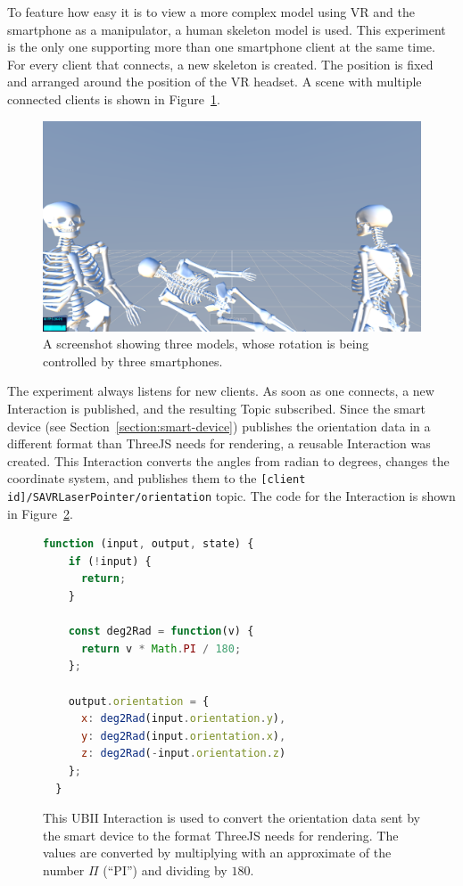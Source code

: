 To feature how easy it is to view a more complex model using VR and the smartphone as a manipulator, a human skeleton model is used. This experiment is the only one supporting more than one smartphone client at the same time. For every client that connects, a new skeleton is created. The position is fixed and arranged around the position of the \ac{VR} headset. A scene with multiple connected clients is shown in Figure~\ref{fig:screenshot-exp-mv}.

\begin{figure}[H]
	\centering
	\includegraphics[width=12cm]{figures/implementation/screenshot_exp_mv.png}
	\caption[Screenshot of the model viewer]{A screenshot showing three models, whose rotation is being controlled by three smartphones.}\label{fig:screenshot-exp-mv}
\end{figure}

The experiment always listens for new clients. As soon as one connects, a new Interaction is published, and the resulting Topic subscribed. Since the smart device (see Section~\ref{section:smart-device}) publishes the orientation data in a different format than ThreeJS needs for rendering, a reusable Interaction was created. This Interaction converts the angles from radian to degrees, changes the coordinate system, and publishes them to the \lstinline[breaklines=false]{[client id]/SAVRLaserPointer/orientation} topic. The code for the Interaction is shown in Figure~\ref{fig:ubii-interaction-angles}.

\begin{figure}[H]
	\begin{lstlisting}[language=JavaScript]
  function (input, output, state) {
    if (!input) {
      return;
    }

    const deg2Rad = function(v) {
      return v * Math.PI / 180;
    };

    output.orientation = {
      x: deg2Rad(input.orientation.y),
      y: deg2Rad(input.orientation.x),
      z: deg2Rad(-input.orientation.z)
    };
  }
 \end{lstlisting}
	\caption[A UBII Interaction of model viewer]{This \ac{UBII} Interaction is used to convert the orientation data sent by the smart device to the format ThreeJS needs for rendering. The values are converted by multiplying with an approximate of the number $\Pi$ (\enquote{PI}) and dividing by $180$.}\label{fig:ubii-interaction-angles} %
\end{figure}

